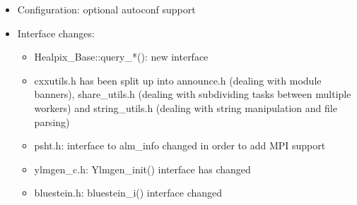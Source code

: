 \documentclass[12pt,twoside]{article}
\begin{document}
{{\begin{itemize}
\item Configuration: optional autoconf support

\item Interface changes:
\begin{itemize}
\item Healpix\_Base::query\_*(): new interface
\item cxxutils.h has been split up into
 announce.h (dealing with module banners), 
 share\_utils.h (dealing with subdividing tasks between multiple workers) and
 string\_utils.h (dealing with string manipulation and file parsing)
\item psht.h: interface to alm\_info changed in order to add MPI support
\item ylmgen\_c.h: Ylmgen\_init() interface has changed
\item bluestein.h: bluestein\_i() interface changed
\end{itemize}

\end{itemize}

}}
\end{document}
